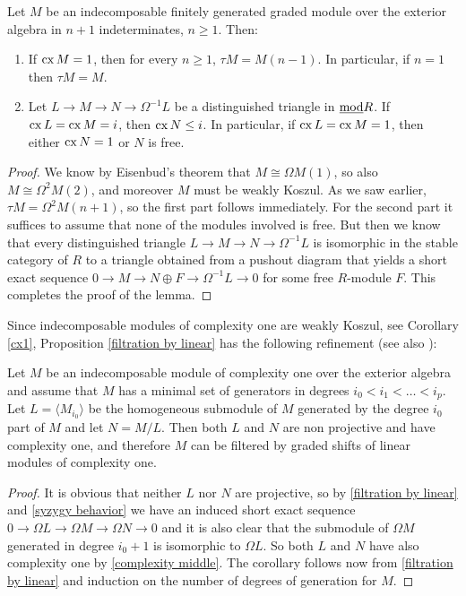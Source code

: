 \documentclass[10pt]{amsart}
\begin{document}
\begin{lemma} Let $M$ be an indecomposable finitely generated graded module over the exterior algebra 
in $n+1$ indeterminates, $n\ge 1$. Then: 
\begin{enumerate}
\item If $\operatorname{cx}\nolimits M=1$, then for every $n\ge 1$, $\tau M=M(n-1)$. In particular, if $n=1$ then $\tau M=M$. 
\item Let $L\rightarrow M\rightarrow N\rightarrow\Omega^{-1}L$ be a distinguished triangle in 
$\underline{\operatorname{mod}} R$. If $\operatorname{cx}\nolimits L=\operatorname{cx}\nolimits M=i$, then $\operatorname{cx}\nolimits N\le i$. In particular, if $\operatorname{cx}\nolimits L=\operatorname{cx}\nolimits M=1$, 
then either $\operatorname{cx}\nolimits N=1$ or $N$ is free.
\end{enumerate}
\end{lemma}
\begin{proof} We know by Eisenbud's theorem that $M\cong\Omega M(1)$, so also $M\cong\Omega^2M(2)$, 
and moreover $M$ must be weakly Koszul. As we saw earlier, $\tau M=\Omega^2M(n+1)$, so the first part 
follows immediately. For the second part it suffices to assume that none of the modules involved is 
free. But then we know that every distinguished triangle $L\rightarrow M\rightarrow N\rightarrow\Omega^{-1}L$ is 
isomorphic in the stable category of $R$ to a triangle obtained from a pushout diagram that yields a 
short exact sequence $0\rightarrow M\rightarrow N\oplus F\rightarrow\Omega^{-1}L\rightarrow 0$ for 
some free $R$-module $F$. This completes the proof of the lemma.
\end{proof}
\noindent Since indecomposable modules of complexity one are weakly Koszul, see Corollary \ref{cx1},
Proposition \ref{filtration by linear} has the following refinement
(see also \cite{GWW1}):

\begin{cor}\label{cx1-filtr} Let $M$ be an indecomposable module of complexity one over the exterior 
algebra and assume that $M$ has a minimal set of generators in degrees $i_0<i_1<\ldots<i_p$. 
Let $L=\langle M_{i_0}\rangle$ be the homogeneous submodule of $M$ generated by the degree $i_0$ 
part of $M$ and let $N=M/L$. Then both $L$ and $N$ are non projective and have complexity one, 
and therefore $M$ can be filtered by graded shifts of linear modules of complexity one.
\end{cor}
 \begin{proof}  It is obvious that neither $L$ nor $N$ are projective, so by 
\ref{filtration by linear} and \ref{syzygy behavior} we have an induced short exact sequence 
$0\rightarrow\Omega L\rightarrow\Omega M\rightarrow\Omega N\rightarrow 0$ and it is also 
clear that the submodule of $\Omega M$ generated in degree $i_0+1$ is isomorphic to $\Omega L$. 
So  both $L$ and $N$  have also complexity one by \ref{complexity middle}.
The corollary follows now from \ref{filtration by linear} and induction on the number of 
degrees of generation for $M$.
 \end{proof}
\end{document}
